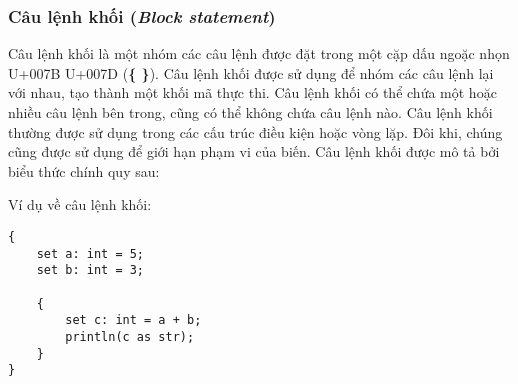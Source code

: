 \subsubsection{Câu lệnh khối (\textit{Block statement})}

Câu lệnh khối là một nhóm các câu lệnh được đặt trong một cặp dấu ngoặc nhọn U+007B U+007D (\textbf{\{ \}}). Câu lệnh khối được sử dụng để nhóm các câu lệnh lại với nhau, tạo thành một khối mã thực thi. Câu lệnh khối có thể chứa một hoặc nhiều câu lệnh bên trong, cũng có thể không chứa câu lệnh nào. Câu lệnh khối thường được sử dụng trong các cấu trúc điều kiện hoặc vòng lặp. Đôi khi, chúng cũng được sử dụng để giới hạn phạm vi của biến. Câu lệnh khối được mô tả bởi biểu thức chính quy sau:

\label{ch2:block_stmt}
\regexblockstmt

\noindent Ví dụ về câu lệnh khối:
\begin{lstlisting}[]
{
    set a: int = 5;
    set b: int = 3;

    {
        set c: int = a + b;
        println(c as str);
    }
}
\end{lstlisting}
